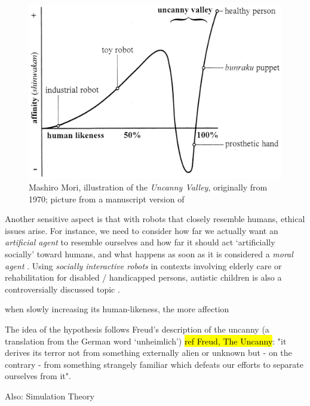 \documentclass[lettersize, apacite, twoside, HRI]{apa_HRI}
\begin{document}
\begin{figure}\centering
  \includegraphics[scale=0.6]{uncanny-valley.jpg}
 \caption{Mashiro Mori, illustration of the \textit{Uncanny Valley}, originally from 1970; picture from a manuscript version of \cite{mori_uncanny_2012}}
 \label{fig:uncanny_valley}       %
 \end{figure}

Another sensitive aspect is that with robots that closely resemble humans, ethical issues arise. For instance, we need to consider how far we actually want an \textit{artificial agent} to resemble ourselves and how far it should act `artificially socially' toward humans, and what happens as soon as it is considered a \textit{moral agent} \cite{sullins_when_2006}. Using \textit{socially interactive robots} in contexts involving elderly care or rehabilitation for disabled / handicapped persons, autistic children is also a controversially discussed topic \cite{robins_robots_2005}.

	
	when slowly increasing its human-likeness, the more affection 
	
The idea of the hypothesis follows Freud's description of the uncanny (a translation from the German word `unheimlich') \hl{ref Freud, The Uncanny}: "it derives its terror not from something externally alien or unknown but - on the contrary - from something strangely familiar which defeats our efforts to separate ourselves from it". \cite{hegel_understanding_2008}

	Also: Simulation Theory
\end{document}

